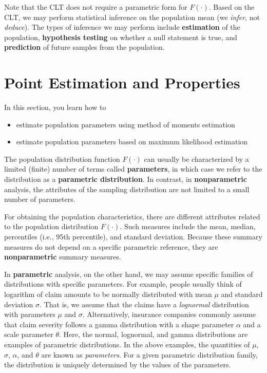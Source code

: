 \documentclass[]{book}
\providecommand{\tightlist}{%
  \setlength{\itemsep}{0pt}\setlength{\parskip}{0pt}}
\theoremstyle{definition}
\theoremstyle{definition}
\theoremstyle{definition}
\theoremstyle{remark}
\begin{document}
Note that the CLT does not require a parametric form for \(F(\cdot)\).
Based on the CLT, we may perform statistical inference on the population
mean (we \emph{infer}, not \emph{deduce}). The types of inference we may
perform include \textbf{estimation} of the population,
\textbf{hypothesis testing} on whether a null statement is true, and
\textbf{prediction} of future samples from the population.

\section{Point Estimation and Properties}\label{S:TS1:PE}

In this section, you learn how to

\begin{itemize}
\tightlist
\item
  estimate population parameters using method of moments estimation
\item
  estimate population parameters based on maximum likelihood estimation
\end{itemize}

The population distribution function \(F(\cdot)\) can usually be
characterized by a limited (finite) number of terms called
\textbf{parameters}, in which case we refer to the distribution as a
\textbf{parametric distribution}. In contrast, in \textbf{nonparametric}
analysis, the attributes of the sampling distribution are not limited to
a small number of parameters.

For obtaining the population characteristics, there are different
attributes related to the population distribution \(F(\cdot)\). Such
measures include the mean, median, percentiles (i.e., 95th percentile),
and standard deviation. Because these summary measures do not depend on
a specific parametric reference, they are \textbf{nonparametric} summary
measures.

In \textbf{parametric} analysis, on the other hand, we may assume
specific families of distributions with specific parameters. For
example, people usually think of logarithm of claim amounts to be
normally distributed with mean \(\mu\) and standard deviation
\(\sigma\). That is, we assume that the claims have a \emph{lognormal}
distribution with parameters \(\mu\) and \(\sigma\). Alternatively,
insurance companies commonly assume that claim severity follows a gamma
distribution with a shape parameter \(\alpha\) and a scale parameter
\(\theta\). Here, the normal, lognormal, and gamma distributions are
examples of parametric distributions. In the above examples, the
quantities of \(\mu\), \(\sigma\), \(\alpha\), and \(\theta\) are known
as \emph{parameters}. For a given parametric distribution family, the
distribution is uniquely determined by the values of the parameters.
\end{document}
